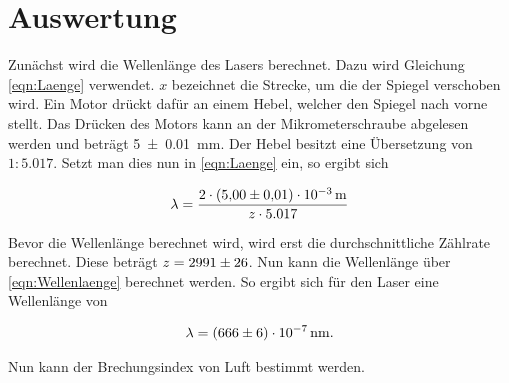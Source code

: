 


\section{Auswertung}
\label{sec:Auswertung}

Zunächst wird die Wellenlänge des Lasers berechnet. Dazu wird Gleichung \eqref{eqn:Laenge} verwendet. 
$x$ bezeichnet die Strecke, um die der Spiegel verschoben wird. Ein Motor drückt dafür an einem Hebel, 
welcher den Spiegel nach vorne stellt. Das Drücken des Motors kann an der Mikrometerschraube abgelesen 
werden und beträgt \qty{5\pm0.01}{\milli \meter}. Der Hebel besitzt eine Übersetzung von $1:5.017$. Setzt man 
dies nun in \eqref{eqn:Laenge} ein, so ergibt sich 

\begin{equation}
    \label{eqn:Wellenlaenge}
    \lambda = \frac{2 \cdot \qty{5\pm0.01e-3}{\meter} }{z \cdot 5.017}
\end{equation}

\noindent Bevor die Wellenlänge berechnet wird, wird erst die durchschnittliche Zählrate berechnet. Diese 
beträgt $z = \num{2991\pm26}$. Nun kann die Wellenlänge über \eqref{eqn:Wellenlaenge} berechnet werden. So 
ergibt sich für den Laser eine Wellenlänge von 

\begin{align}
    \lambda = \qty{666\pm6e-7}{\nano \meter}.
\end{align}

\noindent Nun kann der Brechungsindex von Luft bestimmt werden.


